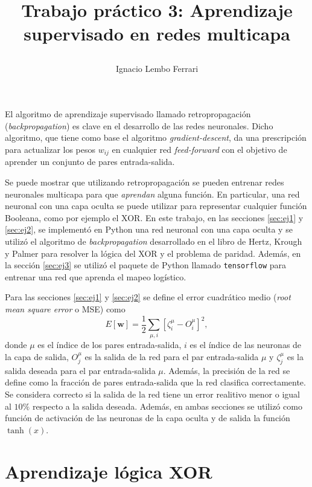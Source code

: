 \documentclass[11pt,twocolumn,twoside]{opticajnl}
\title{
\vspace{0.1cm} 

Trabajo práctico 3: Aprendizaje supervisado en redes multicapa}
\author[1]{\huge{Ignacio Lembo Ferrari}}
\affil[1]{\large{ignaciolembo@ib.edu.ar} 

\vspace{0.1cm}

{\datesfont 14 de octubre de 2023.}

\vspace{0.1cm}
}
\begin{document}
\maketitle

El algoritmo de aprendizaje supervisado llamado retropropagación (\textit{backpropagation}) es clave en el desarrollo de las redes neuronales. Dicho algoritmo, que tiene como base el algoritmo \textit{gradient-descent}, da una prescripción para actualizar los pesos $w_{ij}$ en cualquier red \textit{feed-forward} con el objetivo de aprender un conjunto de pares entrada-salida. 

Se puede mostrar que utilizando retropropagación se pueden entrenar redes neuronales multicapa para que \textit{aprendan} alguna función. En particular, una red neuronal con una capa oculta se puede utilizar para representar cualquier función Booleana, como por ejemplo el XOR. En este trabajo, en las secciones \ref{sec:ej1} y \ref{sec:ej2}, se implementó en Python una red neuronal con una capa oculta y se utilizó el algoritmo de \textit{backpropagation} desarrollado en el libro de Hertz, Krough y Palmer para resolver la lógica del XOR y el problema de paridad. Además, en la sección \ref{sec:ej3} se utilizó el paquete de Python llamado \texttt{tensorflow} para entrenar una red que aprenda el mapeo logístico.

Para las secciones \ref{sec:ej1} y \ref{sec:ej2} se define el error cuadrático medio (\textit{root mean square error} o MSE) como
\begin{equation}
    E[\boldsymbol{w}] = \frac{1}{2} \sum_{\mu,i} \left[ \zeta_i^{\mu} - O_i^{\mu} \right]^2,
\end{equation}
donde $\mu$ es el índice de los pares entrada-salida, $i$ es el índice de las neuronas de la capa de salida, $O_j^{\mu}$ es la salida de la red para el par entrada-salida $\mu$ y $\zeta_j^{\mu}$ es la salida deseada para el par entrada-salida $\mu$. Además, la precisión de la red se define como la fracción de pares entrada-salida que la red clasifica correctamente. Se considera correcto si la salida de la red tiene un error realitivo menor o igual al $10\%$ respecto a la salida deseada. Además, en ambas secciones se utilizó como función de activación de las neuronas de la capa oculta y de salida la función $\tanh(x)$. 


\section{Aprendizaje lógica XOR \label{sec:ej1}}
\end{document}
